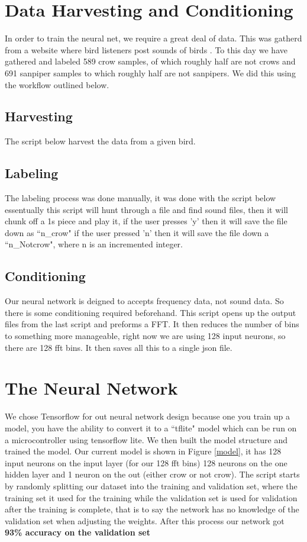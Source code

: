 \documentclass{article}
\begin{document}
\section{Data Harvesting and Conditioning}
In order to train the neural net, we require a great deal of data. This was gatherd from a website where bird listeners post sounds of birds \cite{Bird}. To this day we have gathered and labeled 589 crow samples, of which roughly half are not crows and 691 sanpiper samples to which roughly half are not sanpipers. We did this using the workflow outlined below.

\subsection{Harvesting}
The script below harvest the data from a given bird.


\subsection{Labeling}
The labeling process was done manually, it was done with the script below essentually this script will hunt through a file and find sound files, then it will chunk off a 1s piece and play it, if the user presses 'y' then it will save the file down as ``n\_crow" if the user pressed 'n' then it will save the file down a ``n\_Notcrow", where n is an incremented integer.


\subsection{Conditioning}
Our neural network is deigned to accepts frequency data, not sound data. So there is some conditioning required beforehand. This script opens up the output files from the last script and preforms a FFT. It then reduces the number of bins to something more manageable, right now we are using 128 input neurons, so there are 128 fft bins. It then saves all this to a single json file. 


\section{The Neural Network}
We chose Tensorflow for out neural network design because one you train up a model, you have the ability to convert it to a ``tflite" model which can be run on a microcontroller using tensorflow lite. We then built the model structure and trained the model. Our current model is shown in Figure \ref{model}, it has 128 input neurons on the input layer (for our 128 fft bins) 128 neurons on the one hidden layer and 1 neuron on the out (either crow or not crow). The script starts by randomly splitting our dataset into the training and validation set, where the training set it used for the training while the validation set is used for validation after the training is complete, that is to say the network has no knowledge of the validation set when adjusting the weights. After this process our network got \textbf{93\% accuracy on the validation set}

\end{document}
